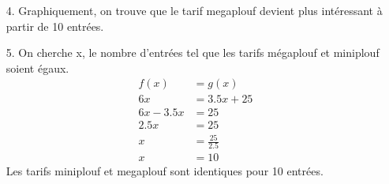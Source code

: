 \documentclass[11pt]{article}
\begin{document}
\begin{enumerate}
\begin{figure}[H]
    \end{figure}
    \item[4.] Graphiquement, on trouve que le tarif megaplouf devient plus intéressant à partir de 10 entrées. 
    \item[5.] On cherche x, le nombre d'entrées tel que les tarifs mégaplouf et miniplouf soient égaux.
    \begin{align*} 
        f(x) &= g(x) \\
         6x  &= 3.5x + 25 \\
         6x - 3.5x &= 25 \\
         2.5x &= 25 \\
         x &= \frac{25}{2.5} \\
         x &= 10
    \end{align*}
    Les tarifs miniplouf et megaplouf sont identiques pour 10 entrées. 

\end{enumerate}
\end{document}
